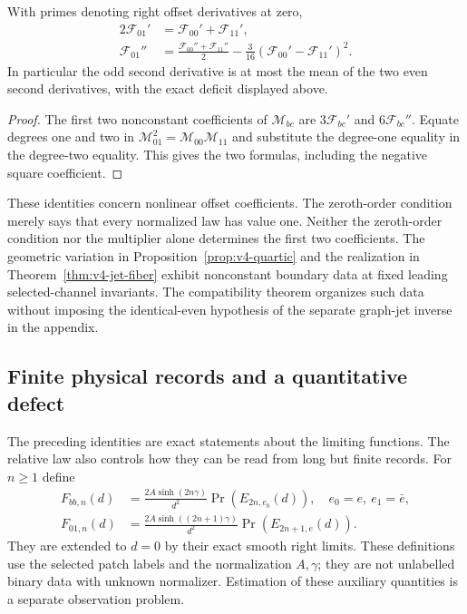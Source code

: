 \begin{corollary}
\label{cor:v9-first-two}
With primes denoting right offset derivatives at zero,
\begin{align}
 2\mathcal F_{01}'&=\mathcal F_{00}'+\mathcal F_{11}',
                                  \label{eq:v9-first-identity}\\
 \mathcal F_{01}''&=
       \frac{\mathcal F_{00}''+\mathcal F_{11}''}{2}
       -\frac3{16}(\mathcal F_{00}'-\mathcal F_{11}')^2.
                                  \label{eq:v9-second-identity}
\end{align}
In particular the odd second derivative is at most the mean of the
two even second derivatives, with the exact deficit displayed above.
\end{corollary}
\begin{proof}
The first two nonconstant coefficients of $\mathcal M_{bc}$ are
$3\mathcal F_{bc}'$ and $6\mathcal F_{bc}''$.
Equate degrees one and two in
$\mathcal M_{01}^2=\mathcal M_{00}\mathcal M_{11}$ and substitute
the degree-one equality in the degree-two equality. This gives the
two formulas, including the negative square coefficient.
\end{proof}

These identities concern nonlinear offset coefficients. The
zeroth-order condition merely says that every normalized law has
value one. Neither the zeroth-order condition nor the multiplier
alone determines the first two coefficients. The geometric variation
in Proposition~\ref{prop:v4-quartic} and the realization in
Theorem~\ref{thm:v4-jet-fiber} exhibit nonconstant boundary data at
fixed leading selected-channel invariants. The compatibility theorem
organizes such data without imposing the identical-even hypothesis
of the separate graph-jet inverse in the appendix.

\subsection{Finite physical records and a quantitative defect}
The preceding identities are exact statements about the limiting
functions. The relative law also controls how they can be read from
long but finite records. For $n\ge1$ define
\begin{equation}\label{eq:v9-finite-laws}
 \begin{split}
 F_{bb,n}(d)&=\frac{2A\sinh(2n\gamma)}{d^2}
              \Pr(E_{2n,e_b}(d)),\quad e_0=e,\ e_1=\bar e,\\
 F_{01,n}(d)&=\frac{2A\sinh((2n+1)\gamma)}{d^2}
              \Pr(E_{2n+1,e}(d)).
 \end{split}
\end{equation}
They are extended to $d=0$ by their exact smooth right limits.
These definitions use the selected patch labels and the normalization
$A,\gamma$; they are not unlabelled binary data with unknown
normalizer. Estimation of these auxiliary quantities is a separate
observation problem.

